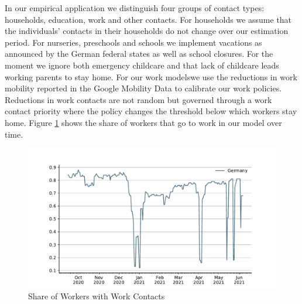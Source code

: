 \FloatBarrier

In our empirical application we distinguish four groups of contact types: households,
education, work and other contacts. For households we assume that the individuals'
contacts in their households do not change over our estimation period. For nurseries,
preschools and schools we implement vacations as announced by the German federal states
as well as school closures. For the moment we ignore both emergency childcare and that
lack of childcare leads working parents to stay home.
%
%
%
%
For our work models\footnotemark we use the reductions in work mobility reported in the
Google Mobility Data \citep{Google2021} to calibrate our work policies. Reductions in
work contacts are not random but governed through a work contact priority where the
policy changes the threshold below which workers stay home. Figure
\ref{fig:work_multiplier} shows the share of workers that go to work in our model over
time.

\begin{figure}[ht]
    \centering
    \includegraphics[width=\textwidth]{../figures/results/figures/data/work_multiplier_since_sep}
    \caption{Share of Workers with Work Contacts}
    \label{fig:work_multiplier}
\end{figure}

